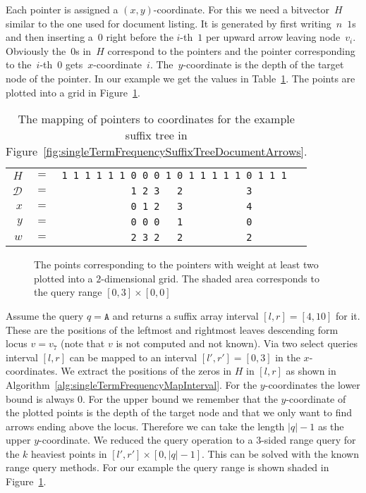 \begin{Proof}
  Each pointer is assigned a $(x,y)$-coordinate. For this we need a bitvector~$H$ similar to the one used for document listing. It is generated by first writing~$n$~$1$s and then inserting a~$0$ right before the $i$-th~$1$ per upward arrow leaving node~$v_i$. Obviously the~$0$s in~$H$ correspond to the pointers and the pointer corresponding to the~$i$-th~$0$ gets~$x$-coordinate~$i$. The~$y$-coordinate is the depth of the target node of the pointer. In our example we get the values in Table~\ref{tbl:topKPointerCoordinates}. The points are plotted into a grid in Figure~\ref{fig:singleTermFrequencyPlot}.
  \begin{table}[htb]
    \centering
    \begin{tabular}{rcl}
      $H$           & $=$ & \texttt{1~1~1~1~1~1~0~0~0~1~0~1~1~1~1~1~0~1~1~1} \\
      $\mathcal{D}$ & $=$ & \texttt{~~~~~~~~~~~~1~2~3~~~2~~~~~~~~~~~3} \\
      $x$           & $=$ & \texttt{~~~~~~~~~~~~0~1~2~~~3~~~~~~~~~~~4} \\
      $y$           & $=$ & \texttt{~~~~~~~~~~~~0~0~0~~~1~~~~~~~~~~~0} \\
      $w$           & $=$ & \texttt{~~~~~~~~~~~~2~3~2~~~2~~~~~~~~~~~2}
    \end{tabular}
    \caption{The mapping of pointers to coordinates for the example suffix tree in Figure~\ref{fig:singleTermFrequencySuffixTreeDocumentArrows}.}
    \label{tbl:topKPointerCoordinates}
  \end{table}

  \begin{figure}[htb]
    \centering
    
    \caption{The points corresponding to the pointers with weight at least two plotted into a $2$-dimensional grid. The shaded area corresponds to the query range $[0, 3] \times [0, 0]$}
    \label{fig:singleTermFrequencyPlot}
  \end{figure}

  Assume the query $q = \texttt{A}$ and  returns a suffix array interval $[l,r] = [4,10]$ for it. These are the positions of the leftmost and rightmost leaves descending form locus $v = v_7$ (note that $v$ is not computed and not known). Via two select queries interval $[l,r]$ can be mapped to an interval $[l',r'] = [0,3]$ in the $x$-coordinates. We extract the positions of the zeros in $H$ in $[l,r]$ as shown in Algorithm~\ref{alg:singleTermFrequencyMapInterval}. For the $y$-coordinates the lower bound is always $0$. For the upper bound we remember that the $y$-coordinate of the plotted points is the depth of the target node and that we only want to find arrows ending above the locus. Therefore we can take the length $\vert q \vert - 1$ as the upper $y$-coordinate. We reduced the query operation to a $3$-sided range query for the $k$ heaviest points in $[l', r'] \times [0, \vert q \vert - 1]$. This can be solved with the known range query methods. For our example the query range is shown shaded in Figure~\ref{fig:singleTermFrequencyPlot}.


\end{Proof}
